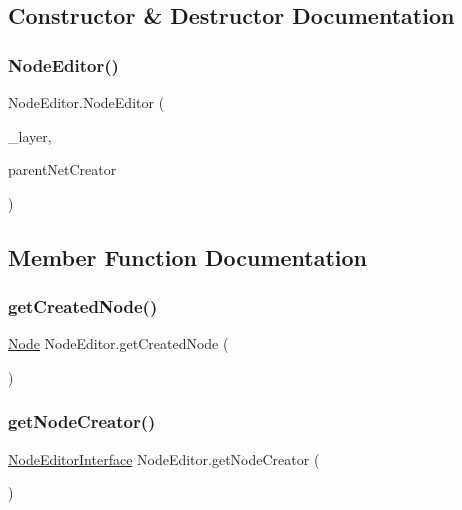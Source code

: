 \subsection{Constructor \& Destructor Documentation}
\mbox{\label{class_node_editor_abd0642bacf3934685527b94425770f64}} 
\subsubsection{\texorpdfstring{Node\+Editor()}{NodeEditor()}}
{\footnotesize\ttfamily Node\+Editor.\+Node\+Editor (\begin{DoxyParamCaption}\item[{int}]{\+\_\+layer,  }\item[{\mbox{\hyperlink{class_network_editor}{Network\+Editor}}}]{parent\+Net\+Creator }\end{DoxyParamCaption})}



\subsection{Member Function Documentation}
\mbox{\label{class_node_editor_a42b9d431ac444320d4d628d13868c19f}} 
\subsubsection{\texorpdfstring{get\+Created\+Node()}{getCreatedNode()}}
{\footnotesize\ttfamily \mbox{\hyperlink{class_node}{Node}} Node\+Editor.\+get\+Created\+Node (\begin{DoxyParamCaption}{ }\end{DoxyParamCaption})}

\mbox{\label{class_node_editor_acdd21c090158fa8bbfd636bec7d86309}} 
\subsubsection{\texorpdfstring{get\+Node\+Creator()}{getNodeCreator()}}
{\footnotesize\ttfamily \mbox{\hyperlink{interface_node_editor_interface}{Node\+Editor\+Interface}} Node\+Editor.\+get\+Node\+Creator (\begin{DoxyParamCaption}{ }\end{DoxyParamCaption})}

